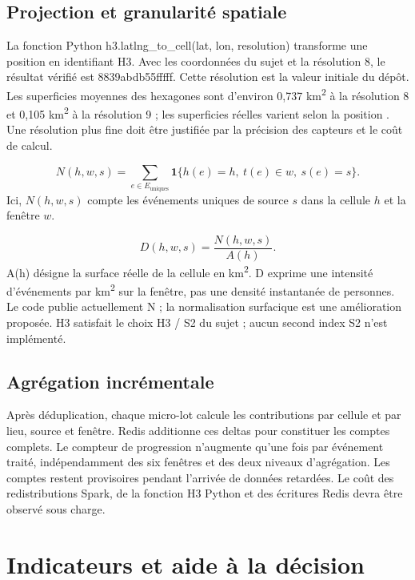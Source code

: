 \documentclass[a4paper,11pt]{article}
\begin{document}
\subsection{Projection et granularité spatiale}
La fonction Python {\small\ttfamily h3.\allowbreak{}latlng\_\allowbreak{}to\_\allowbreak{}cell(lat, lon, resolution)} transforme une position en identifiant H3. Avec les coordonnées du sujet et la résolution 8, le résultat vérifié est {\small\ttfamily 8839abdb55fffff}. Cette résolution est la valeur initiale du dépôt. Les superficies moyennes des hexagones sont d'environ 0,737 km\textsuperscript{2} à la résolution 8 et 0,105 km\textsuperscript{2} à la résolution 9 ; les superficies réelles varient selon la position \cite{ref5}. Une résolution plus fine doit être justifiée par la précision des capteurs et le coût de calcul.
\par
\[N(h,w,s)=\sum_{e\in E_{\mathrm{uniques}}}\mathbf{1}\{h(e)=h,\ t(e)\in w,\ s(e)=s\}.\]
Ici, $N(h,w,s)$ compte les événements uniques de source $s$ dans la cellule $h$ et la fenêtre $w$.

\[D(h,w,s)=\frac{N(h,w,s)}{A(h)}.\]
A(h) désigne la surface réelle de la cellule en km\textsuperscript{2}. D exprime une intensité d'événements par km\textsuperscript{2} sur la fenêtre, pas une densité instantanée de personnes. Le code publie actuellement N ; la normalisation surfacique est une amélioration proposée. H3 satisfait le choix H3 / S2 du sujet ; aucun second index S2 n'est implémenté.
\par
\subsection{Agrégation incrémentale}
Après déduplication, chaque micro-lot calcule les contributions par cellule et par lieu, source et fenêtre. Redis additionne ces deltas pour constituer les comptes complets. Le compteur de progression n'augmente qu'une fois par événement traité, indépendamment des six fenêtres et des deux niveaux d'agrégation. Les comptes restent provisoires pendant l'arrivée de données retardées. Le coût des redistributions Spark, de la fonction H3 Python et des écritures Redis devra être observé sous charge.
\par

\clearpage
\section{Indicateurs et aide à la décision}\label{sec:5}
\end{document}
